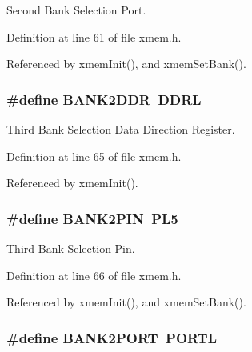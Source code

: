 Second Bank Selection Port. 



Definition at line 61 of file xmem.\-h.



Referenced by xmem\-Init(), and xmem\-Set\-Bank().

\hypertarget{group__xmem_ga62f56230c5f5f7220c44ab1c93d677ab}{
\subsubsection[{B\-A\-N\-K2\-D\-D\-R}]{\setlength{\rightskip}{0pt plus 5cm}\#define B\-A\-N\-K2\-D\-D\-R~D\-D\-R\-L}}\label{group__xmem_ga62f56230c5f5f7220c44ab1c93d677ab}


Third Bank Selection Data Direction Register. 



Definition at line 65 of file xmem.\-h.



Referenced by xmem\-Init().

\hypertarget{group__xmem_ga74c95f6ccdb5e482e97a5af53ed74229}{
\subsubsection[{B\-A\-N\-K2\-P\-I\-N}]{\setlength{\rightskip}{0pt plus 5cm}\#define B\-A\-N\-K2\-P\-I\-N~P\-L5}}\label{group__xmem_ga74c95f6ccdb5e482e97a5af53ed74229}


Third Bank Selection Pin. 



Definition at line 66 of file xmem.\-h.



Referenced by xmem\-Init(), and xmem\-Set\-Bank().

\hypertarget{group__xmem_gad35afb0251524c201c2d60f3d035af32}{
\subsubsection[{B\-A\-N\-K2\-P\-O\-R\-T}]{\setlength{\rightskip}{0pt plus 5cm}\#define B\-A\-N\-K2\-P\-O\-R\-T~P\-O\-R\-T\-L}}\label{group__xmem_gad35afb0251524c201c2d60f3d035af32}


